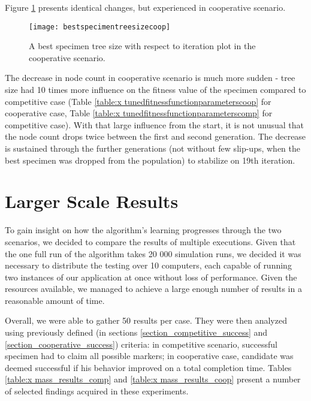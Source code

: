 Figure \ref{fig:x cooperativebestspecimentreesizeplot} presents identical changes, but experienced in cooperative scenario.
\begin{figure}[H]
    \centering
    \texttt{[image: bestspecimentreesizecoop]}
    \caption{A best specimen tree size with respect to iteration plot in the cooperative scenario.}
    \label{fig:x cooperativebestspecimentreesizeplot}
\end{figure}
The decrease in node count in cooperative scenario is much more sudden - tree size had 10 times more influence on the fitness value of the specimen compared to competitive case (Table \ref{table:x tunedfitnessfunctionparameterscoop} for cooperative case, Table \ref{table:x tunedfitnessfunctionparameterscomp} for competitive case). With that large influence from the start, it is not unusual that the node count drops twice between the first and second generation. The decrease is sustained through the further generations (not without few slip-ups, when the best specimen was dropped from the population) to stabilize on 19th iteration.
\section{ Larger Scale Results } %
To gain insight on how the algorithm's learning progresses through the two scenarios, we decided to compare the results of multiple executions. Given that the one full run of the algorithm takes 20 000 simulation runs, we decided it was necessary to distribute the testing over 10 computers, each capable of running two instances of our application at once without loss of performance. Given the resources available, we managed to achieve a large enough number of results in a reasonable amount of time.

Overall, we were able to gather 50 results per case. They were then analyzed using previously defined (in sections \ref{section_competitive_success} and \ref{section_cooperative_success}) criteria: in competitive scenario, successful specimen had to claim all possible markers; in cooperative case, candidate was deemed successful if his behavior improved on a total completion time. Tables \ref{table:x mass_results_comp} and \ref{table:x mass_results_coop} present a number of selected findings acquired in these experiments.


